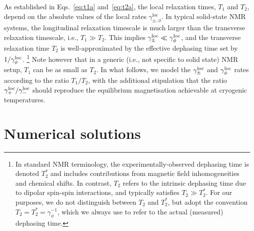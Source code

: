 \documentclass[aps,prd,10pt,twocolumn,superscriptaddress,floatfix,nofootinbib,amsmath,amssymb,altaffilletter,preprintnumbers]{revtex4-1}
\begin{document}
As established in Eqs.~\eqref{eq:t1a} and~\eqref{eq:t2a}, the local relaxation times, $T_1$ and $T_2$, depend on the absolute values of the local rates $\gamma^{\text{loc}}_{\pm,\phi}$. In typical solid-state NMR systems, the longitudinal relaxation timescale is much larger than the transverse relaxation timescale, i.e., $T_1\gg T_2$. This implies $\gamma^{\rm loc}_{\pm} \ll \gamma^{\rm loc}_{\phi}$, and the transverse relaxation time $T_2$ is well-approximated by the effective dephasing time set by $1/\gamma^{\rm loc}_{\phi}$.%
%
\footnote{In standard NMR terminology, the experimentally-observed dephasing time is denoted $T_2^*$ and includes contributions from magnetic field inhomogeneities and chemical shifts. In contrast, $T_2$ refers to the intrinsic dephasing time due to dipolar spin-spin interactions, and typically satisfies $T_2 \gg T_2^*$. For our purposes, we do not distinguish between $T_2$ and $T_2^*$, but adopt the convention $T_2 = T_2^* = \gamma_{\phi}^{-1}$, which we always use to refer to the actual (measured) dephasing time.}
%
Note however that in a generic (i.e., not specific to solid state) NMR setup, $T_1$ can be as small as $T_2$. In what follows, we model the $\gamma^{\rm loc}_{\pm}$ and $\gamma_\phi^{\rm loc}$ rates according to the ratio $T_1/T_2$, with the additional stipulation that the ratio $\gamma^{\rm loc}_+/\gamma^{\rm loc}_-$ should reproduce the equilibrium magnetisation achievable at cryogenic temperatures.




\section{Numerical solutions}\label{sec:numerical}
\end{document}
